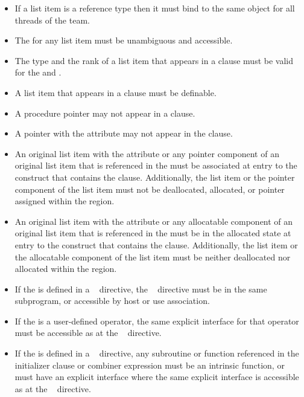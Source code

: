 \begin{itemize}
\item If a list item is a reference type then it must bind to the same object for all threads of 
the team.

\item The  for any list item must be unambiguous and accessible.
\ccppspecificend
\bigskip

\fortranspecificstart
\item The type and the rank of a list item that appears in a  clause must be valid for the  and .

\item A list item that appears in a  clause must be definable.

\item A procedure pointer may not appear in a  clause.

\item A pointer with the  attribute may not appear in the  
clause. 

\item An original list item with the  attribute or any
  pointer component of an original list item that is referenced in the
   must be associated at entry to the construct that
  contains the  clause. Additionally, the list item or
  the pointer component of the list item must not be deallocated,
  allocated, or pointer assigned within the region.

\item An original list item with the  attribute or
  any allocatable component of an original list item that is
  referenced in the  must be in the allocated state at entry
  to the construct that contains the 
  clause. Additionally, the list item or the allocatable component of
  the list item must be neither deallocated nor allocated within the
  region.

\item If the  is defined in a ~ directive, the 
~ directive must be in the same subprogram, or accessible by 
host or use association.

\item If the  is a user-defined operator, the same explicit interface for 
that operator must be accessible as at the ~ directive.

\item If the  is defined in a ~ directive, any 
subroutine or function referenced in the initializer clause or combiner expression 
must be an intrinsic function, or must have an explicit interface where the same 
explicit interface is accessible as at the ~ directive.
\fortranspecificend
\end{itemize}










